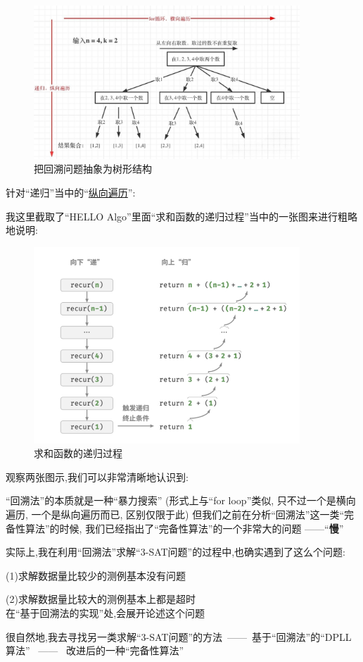         \begin{figure}[H]
            \centering
            \includegraphics[width=10cm]{Figure/Figure_1.png}
            \caption{把回溯问题抽象为树形结构}
        \end{figure}
        \noindent
        针对``递归''当中的``\underline{纵向遍历}'':\par
            我这里截取了``HELLO Algo''里面``求和函数的递归过程''当中的一张图来进行粗略地说明:

        \begin{figure}[H]
            \centering
            \includegraphics[width=10cm]{Figure/Figure_2.jpg}
            \caption{求和函数的递归过程}
        \end{figure}

        \noindent
        观察两张图示,我们可以非常清晰地认识到:\par
        ``回溯法''的本质就是一种``暴力搜索''
        (形式上与``for loop''类似,
        只不过一个是横向遍历,
        一个是纵向遍历而已,
        区别仅限于此)
        但我们之前在分析``回溯法''这一类``完备性算法''的时候,
        我们已经指出了``完备性算法''的一个非常大的问题 ——``\textbf{慢}''\par
            实际上,我在利用``回溯法''求解``3-SAT问题''的过程中,也确实遇到了这么个问题:\par
                (1)求解数据量比较少的测例基本没有问题\par
                (2)求解数据量比较大的测例基本上都是超时\\
            在``基于回溯法的实现''处,会展开论述这个问题\par
                很自然地,我去寻找另一类求解``3-SAT问题''的方法\ ——\ 基于``回溯法''的``DPLL算法'' \ —— \ 改进后的一种``完备性算法''
